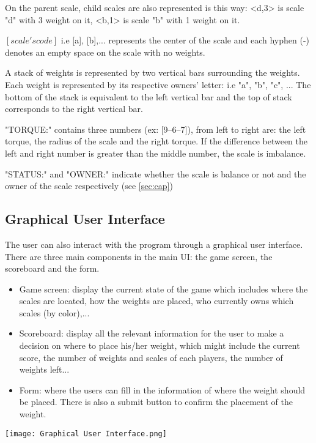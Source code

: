 \documentclass[12pt]{article}
\begin{document}
On the parent scale, child scales are also represented is this way: <d,3> is
scale "d" with 3 weight on it, <b,1> is scale "b" with 1 weight on it. 

$[scale's code]$ i.e [a], [b],... represents the center of the scale and each hyphen (-) denotes
an empty space on the scale with no weights.

A stack of weights is represented by two vertical bars surrounding the weights.
Each weight is represented by its respective owners' letter: i.e "a", "b", "c",
... The bottom of the stack is equivalent to the left vertical bar and the top
of stack corresponds to the right vertical bar.

"TORQUE:" contains three numbers (ex: [9--6--7]), from left to right are: the
left torque, the radius of the scale and the right torque. If the difference
between the left and right number is greater than the middle number, the scale
is imbalance.

"STATUS:" and "OWNER:" indicate whether the scale is balance or not and the
owner of the scale respectively (see \autoref{sec:cap})

\subsection{Graphical User Interface} 
The user can also interact with the program through a graphical user interface.
There are three main components in the main UI: the game screen, the scoreboard and
the form. 
\begin{itemize}
  \item Game screen: display the current state of the game which includes
    where the scales are located, how the weights are placed, who currently owns
    which scales (by color),...
  \item Scoreboard: display all the relevant information for the user to
    make a decision on where to place his/her weight, which might include the
    current score, the number of weights and scales of each players, the number
    of weights left...
  \item Form: where the users can fill in the information of where the
    weight should be placed. There is also a submit button to confirm the
    placement of the weight.
\end{itemize}

\begin{center}
  \texttt{[image: Graphical User Interface.png]}
\end{center}
\end{document}
